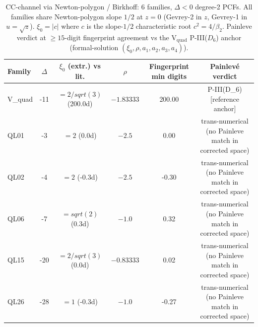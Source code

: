 \begin{table}[ht]
\centering
\small
\caption{CC-channel via Newton-polygon / Birkhoff: 6 families, $\Delta<0$ degree-2 PCFs.  All families share Newton-polygon slope $1/2$ at $z=0$ (Gevrey-2 in $z$, Gevrey-1 in $u=\sqrt{z}$). $\xi_0 = |c|$ where $c$ is the slope-$1/2$ characteristic root $c^2 = 4/\beta_2$. Painleve verdict at $\geq 15$-digit fingerprint agreement vs the V$_{\text{quad}}$ P-III($D_6$) anchor (formal-solution $(\xi_0,\rho,a_1,a_2,a_3,a_4)$).}
\label{tab:cc-channel-v2}
\begin{tabular}{l c c c c c}
\toprule
Family & $\Delta$ & $\xi_0$ (extr.) vs lit. & $\rho$ & Fingerprint min digits & Painlev\'e verdict \\
\midrule
V_quad & -11 & $=2/sqrt(3)$ (200.0d) & $-1.83333$ & 200.00 & P-III(D_6) [reference anchor] \\
QL01 & -3 & $=2$ (0.0d) & $-2.5$ & 0.00 & trans-numerical (no Painleve match in corrected space) \\
QL02 & -4 & $=2$ (-0.3d) & $-2.5$ & -0.30 & trans-numerical (no Painleve match in corrected space) \\
QL06 & -7 & $=sqrt(2)$ (0.3d) & $-1.0$ & 0.32 & trans-numerical (no Painleve match in corrected space) \\
QL15 & -20 & $=2/sqrt(3)$ (0.0d) & $-0.83333$ & 0.02 & trans-numerical (no Painleve match in corrected space) \\
QL26 & -28 & $=1$ (-0.3d) & $-1.0$ & -0.27 & trans-numerical (no Painleve match in corrected space) \\
\bottomrule
\end{tabular}
\end{table}